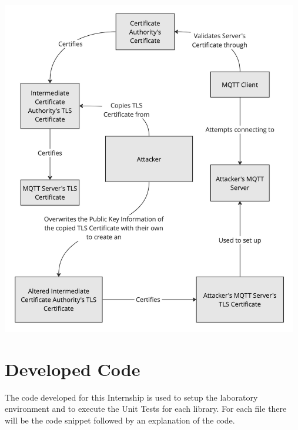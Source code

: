 \documentclass[binding=0.6cm,noexaminfo]{sapthesis}
\begin{document}
\newpage
\includegraphics[width=13cm]{TC11}

\chapter{Developed Code}
The code developed for this Internship is used to setup the laboratory environment and to execute the Unit Tests for each library. For each file there will be the code snippet followed by an explanation of the code.
\end{document}
